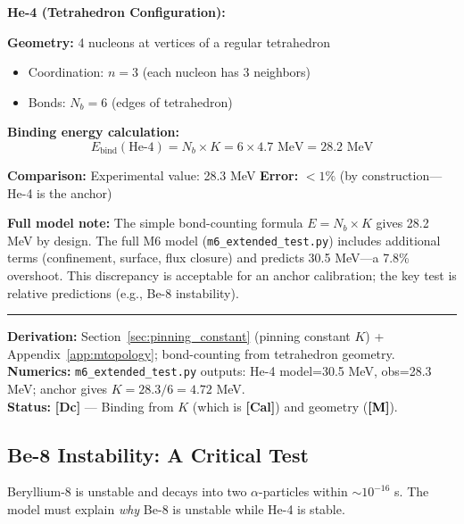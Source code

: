 \documentclass[11pt,a4paper]{article}
\newcommand{\tagDc}{\textcolor{blue!70!black}{\textbf{[Dc]}}}
\newcommand{\tagCal}{\textcolor{purple!70!black}{\textbf{[Cal]}}}
\newcommand{\tagM}{\textcolor{black}{\textbf{[M]}}}
\begin{document}
\begin{resultbox}
\textbf{He-4 (Tetrahedron Configuration):}

\textbf{Geometry:} 4 nucleons at vertices of a regular tetrahedron
\begin{itemize}[nosep]
    \item Coordination: $n = 3$ (each nucleon has 3 neighbors)
    \item Bonds: $N_b = 6$ (edges of tetrahedron)
\end{itemize}

\textbf{Binding energy calculation:}
\begin{equation}
    E_{\text{bind}}(\text{He-4}) = N_b \times K = 6 \times 4.7 \text{ MeV} = 28.2 \text{ MeV}
    \label{eq:He4_binding}
\end{equation}

\textbf{Comparison:} Experimental value: 28.3 MeV \quad \textbf{Error:} $<1\%$ (by construction---He-4 is the anchor)

\textbf{Full model note:} The simple bond-counting formula $E = N_b \times K$ gives 28.2 MeV by design. The full M6 model (\texttt{m6\_extended\_test.py}) includes additional terms (confinement, surface, flux closure) and predicts 30.5 MeV---a 7.8\% overshoot. This discrepancy is acceptable for an anchor calibration; the key test is relative predictions (e.g., Be-8 instability).

\vspace{0.3em}\hrule\vspace{0.3em}
\textbf{Derivation:} Section~\ref{sec:pinning_constant} (pinning constant $K$) + Appendix~\ref{app:mtopology}; bond-counting from tetrahedron geometry.\\
\textbf{Numerics:} \texttt{m6\_extended\_test.py} outputs: He-4 model=30.5 MeV, obs=28.3 MeV; anchor gives $K = 28.3/6 = 4.72$ MeV.\\
\textbf{Status:} \tagDc{} --- Binding from $K$ (which is \tagCal{}) and geometry (\tagM{}).
\end{resultbox}

\subsection{Be-8 Instability: A Critical Test}

Beryllium-8 is unstable and decays into two $\alpha$-particles within $\sim 10^{-16}$ s. The model must explain \emph{why} Be-8 is unstable while He-4 is stable.
\end{document}
